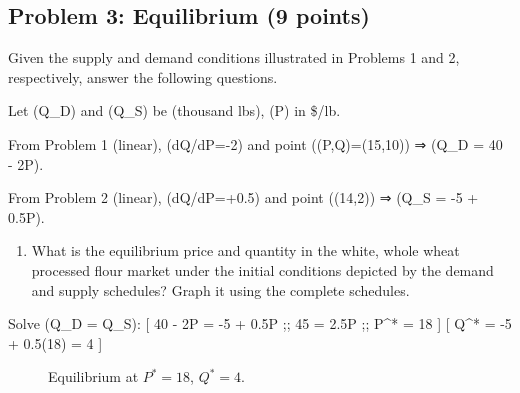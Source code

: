 \documentclass[
  letterpaper,
  DIV=11,
  numbers=noendperiod]{scrartcl}
\providecommand{\tightlist}{%
  \setlength{\itemsep}{0pt}\setlength{\parskip}{0pt}}
\begin{document}
\subsection{Problem 3: Equilibrium (9
points)}\label{problem-3-equilibrium-9-points}

Given the supply and demand conditions illustrated in Problems 1 and 2,
respectively, answer the following questions.

Let (Q\_D) and (Q\_S) be (thousand lbs), (P) in \$/lb.

From Problem 1 (linear), (dQ/dP=-2) and point ((P,Q)=(15,10)) ⇒ (Q\_D =
40 - 2P).

From Problem 2 (linear), (dQ/dP=+0.5) and point ((14,2)) ⇒ (Q\_S = -5 +
0.5P).

\begin{enumerate}
\def\labelenumi{\alph{enumi}.}
\tightlist
\item
  What is the equilibrium price and quantity in the white, whole wheat
  processed flour market under the initial conditions depicted by the
  demand and supply schedules? Graph it using the complete schedules.
\end{enumerate}

Solve (Q\_D = Q\_S): {[} 40 - 2P = -5 + 0.5P ;\Rightarrow; 45 = 2.5P
;\Rightarrow; P\^{}* = 18 {]} {[} Q\^{}* = -5 + 0.5(18) = 4 {]}

\begin{figure}[h]
\centering
{}
\caption{Equilibrium at \(P^*=18\), \(Q^*=4\).}
\end{figure}
\end{document}
